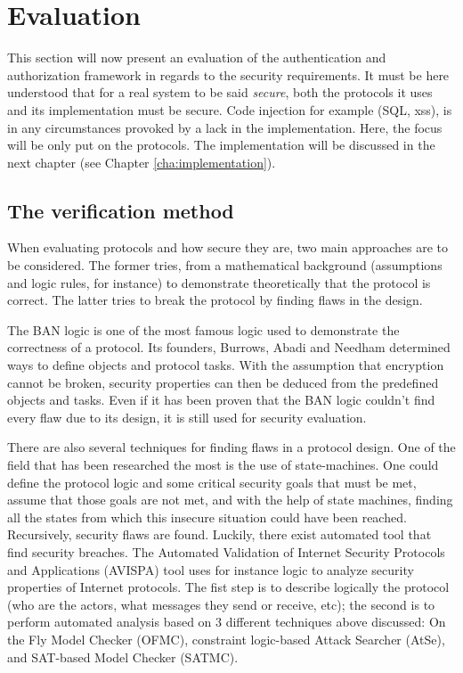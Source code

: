 \chapter{Evaluation}
\label{cha:evaluation}
This section will now present an evaluation of the authentication and authorization framework in regards to the security requirements. It must be here understood that for a real system to be said \textit{secure}, both the protocols it uses and its implementation must be secure. Code injection for example (SQL, xss), is in any circumstances provoked by a lack in the implementation. Here, the focus will be only put on the protocols. The implementation will be discussed in the next chapter (see Chapter \ref{cha:implementation}).

\section{The verification method}
When evaluating protocols and how secure they are, two main approaches are to be considered. The former tries, from a mathematical background (assumptions and logic rules, for instance) to demonstrate theoretically that the protocol is correct. The latter tries to break the protocol by finding flaws in the design.

The BAN logic is one of the most famous logic used to demonstrate the correctness of a protocol. Its founders,  Burrows, Abadi and Needham determined ways to define objects and protocol tasks. With the assumption that encryption cannot be broken, security properties can then be deduced from the predefined objects and tasks. Even if it has been proven that the BAN logic couldn't find every flaw due to its design, it is still used for security evaluation.

There are also several techniques for finding flaws in a protocol design. One of the field that has been researched the most is the use of state-machines. One could define the protocol logic and some critical security goals that must be met, assume that those goals are not met, and with the help of state machines, finding all the states from which this insecure situation could have been reached. Recursively, security flaws are found. Luckily, there exist automated tool that find security breaches. The Automated Validation of Internet Security Protocols and Applications (AVISPA) tool uses for instance logic to analyze security properties of Internet protocols. The fist step is to describe logically the protocol (who are the actors, what messages they send or receive, etc); the second is to perform automated analysis based on 3 different techniques above discussed: On the Fly Model Checker (OFMC), constraint  logic-based Attack Searcher (AtSe), and SAT-based Model Checker (SATMC).

